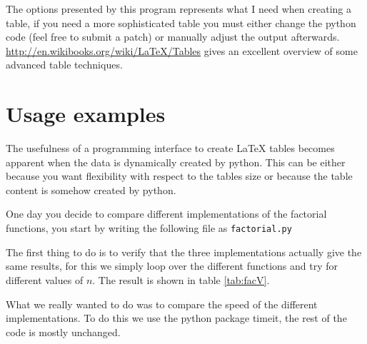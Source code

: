 The options presented by this program represents what I need when creating a table,
if you need a more sophisticated table you must either change the python code
(feel free to submit a patch) or manually adjust the output afterwards.
\url{http://en.wikibooks.org/wiki/LaTeX/Tables} gives an excellent overview
of some advanced table techniques.

\section{Usage examples}
The usefulness of a programming interface to create \LaTeX{}
tables becomes apparent when the data is dynamically created by python.
This can be either because you want flexibility with respect to the tables size
or because the table content is somehow created by python.

One day you decide to compare different implementations of the
factorial functions, you start by writing the following file
as \verb!factorial.py!


The first thing to do is to verify that the three implementations actually give
the same results, for this we simply loop over the different functions and try for
different values of $n$. The result is shown in table \ref{tab:facV}.



What we really wanted to do was to
compare the speed of the different implementations. To do this
we use the python package timeit, the rest of the code is mostly unchanged.




%
%

